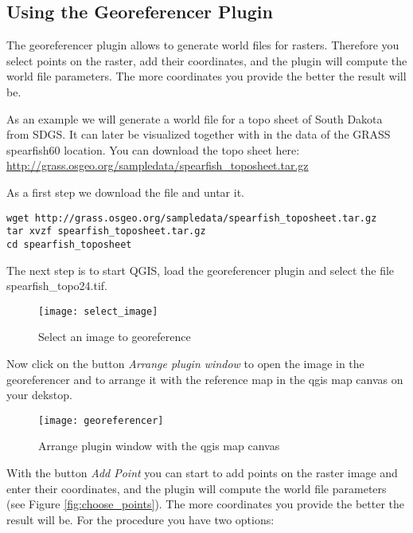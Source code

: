 \subsection{Using the Georeferencer Plugin}

The georeferencer plugin allows to generate world files for rasters. Therefore
you select points on the raster, add their coordinates, and the plugin will 
compute the world file parameters. The more coordinates you provide the better 
the result will be.

As an example we will generate a world file for a topo sheet of South Dakota 
from SDGS. It can later be visualized together with in the data of the GRASS 
spearfish60 location. You can download the topo sheet here: \\
\url{http://grass.osgeo.org/sampledata/spearfish\_toposheet.tar.gz}

As a first step we download the file and untar it.

\begin{verbatim}
wget http://grass.osgeo.org/sampledata/spearfish_toposheet.tar.gz
tar xvzf spearfish_toposheet.tar.gz
cd spearfish_toposheet
\end{verbatim}

The next step is to start QGIS, load the georeferencer plugin and select 
the file spearfish\_topo24.tif.

\begin{figure}[ht]
\begin{center}
  \caption{Select an image to georeference}\label{fig:select_image}\smallskip
  \texttt{[image: select\_image]}
\end{center}
\end{figure}

Now click on the button \textsl{Arrange plugin window} to open the image 
in the georeferencer and to arrange it with the reference map in the qgis map canvas on your dekstop.

\begin{figure}[ht]
\begin{center}
  \caption{Arrange plugin window with the qgis map canvas}\label{fig:georeferencer}\smallskip
  \texttt{[image: georeferencer]}
\end{center}
\end{figure}

With the button \textsl{Add Point} you can start to add points on the 
raster image and enter their coordinates, and the plugin will compute the 
world file parameters (see Figure \ref{fig:choose_points}). The more coordinates you provide the better the 
result will be. For the procedure you have two options:

